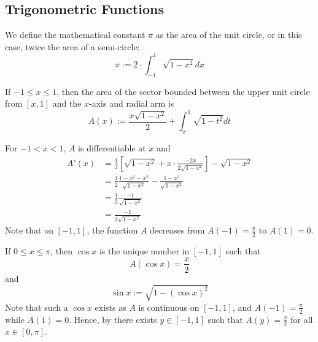 \documentclass[12pt]{report}
\begin{document}
\begin{subappendices}
    \section{Trigonometric Functions}

    \begin{defn}{}{}
        We define the mathematical constant $\pi$ as the area of the unit circle, or in this case, twice the area of a semi-circle:\begin{equation}
            \pi:=2\cdot \int_{-1}^1\sqrt{1-x^2}dx
        \end{equation}
    \end{defn}


    \begin{defn}{}{}
        If $-1 \leq x \leq 1$, then the area of the sector bounded between the upper unit circle from $[x,1]$ and the $x$-axis and radial arm is \begin{equation}
            A(x) := \frac{x\sqrt{1-x^2}}{2} + \int_x^1\sqrt{1-t^2}dt
        \end{equation}
    \end{defn}

    \begin{rmk}{}{}
        For $-1 < x < 1$, $A$ is differentiable at $x$ and \begin{align*}
            A'(x) &= \frac{1}{2}\left[\sqrt{1-x^2} +x\cdot\frac{-2x}{2\sqrt{1-x^2}}\right] -\sqrt{1-x^2} \\
            &= \frac{1}{2}\frac{1-x^2-x^2}{\sqrt{1-x^2}} - \frac{1-x^2}{\sqrt{1-x^2}} \\
            &= \frac{1}{2}\frac{-1}{\sqrt{1-x^2}} \\
            &= \frac{-1}{2\sqrt{1-x^2}}
        \end{align*}
        Note that on $[-1,1]$, the function $A$ decreases from $A(-1) = \frac{\pi}{2}$ to $A(1) = 0$.
    \end{rmk}

    \begin{defn}{}{}
        If $0 \leq x \leq \pi$, then $\cos x$ is the unique number in $[-1,1]$ such that \begin{equation}
            A(\cos x) = \frac{x}{2}
        \end{equation}
        and \begin{equation}
            \sin x := \sqrt{1-(\cos x)^2}
        \end{equation}
        Note that such a $\cos x$ exists as $A$ is continuous on $[-1,1]$, and $A(-1) = \frac{\pi}{2}$ while $A(1) = 0$. Hence, by  there exists $y \in [-1,1]$ such that $A(y) = \frac{x}{2}$ for all $x \in [0,\pi]$.
    \end{defn}



\end{subappendices}
\end{document}

